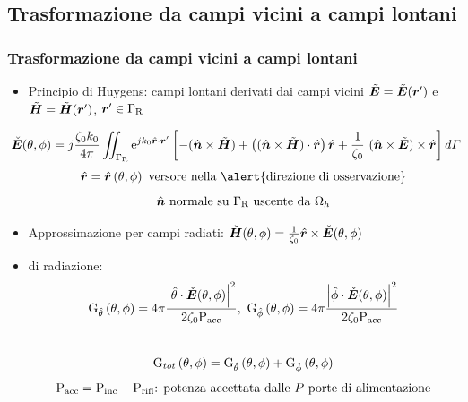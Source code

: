 \documentclass[11pt]{beamer}
\begin{document}
\subsection{Trasformazione da campi vicini a campi lontani}
\frame
{
\frametitle{Trasformazione da campi vicini a campi lontani}
\begin{itemize}
\item \alert{Principio di Huygens}: campi lontani derivati dai campi vicini $\tilde{\mbfit{E}}=\tilde{\mbfit{E}}(\mbfit{r'})$ e $\tilde{\mbfit{H}}=\tilde{\mbfit{H}}(\mbfit{r'})$, $\mbfit{r'} \in \mrm{\Gamma_R}$
\begin{center}
\vspace{-.5cm} \scriptsize $$\hspace{-.5cm}\check{\mbfit{E}}(\theta, \phi) = j \frac{\zeta_0 k_0}{4 \pi} \int \! \! \! \! \int_\mrm{\Gamma_R}  \mrm{e}^{jk_0 \hat{\mbfit{r}} \cdot \mbfit{r'}} \left [ - (\hat{\mbfit{n}} \times \tilde{\mbfit{H}})  + \left ( ( \hat{\mbfit{n}} \times \tilde{\mbfit{H}} ) \cdot \hat{\mbfit{r}} \right ) \hat{\mbfit{r}} + \frac{1}{\zeta_0} \ (\hat{\mbfit{n}} \times \tilde{\mbfit{E}})  \times \hat{\mbfit{r}} \right ]  d{\Gamma}$$ \vspace{-.2cm} \footnotesize $$ \hat{\mbfit{r}} = \hat{\mbfit{r}} \left ( \theta, \phi \right ) \textnormal{ versore nella \alert{direzione di osservazione}}$$ \vspace{-.5cm} $$\hat{\mbfit{n}} \textnormal{ normale su } \mrm{\Gamma_R} \textnormal{ uscente da } \mrm{\Omega}_h $$
\end{center} %
\pause
\item \normalsize \alert{Approssimazione per campi radiati}: $\check{\mbfit{H}}(\theta, \phi) =  \frac{1}{\zeta_0} \hat{\mbfit{r}} \times \check{\mbfit{E}}(\theta, \phi )$ \\ \pause %
\item \alert{ di radiazione}: \vspace{-.2cm}
$$\mrm{G}_{\hat{\theta}} \left ( \theta, \phi \right ) = 4 \pi \frac{\left | {{\hat{\theta}}} \cdot \check{\mbfit E} (\theta, \phi) \right |^2}{ 2 \zeta_0 \mrm{P}_\mrm{acc}}, \ \mrm{G}_{\hat{\phi}} \left ( \theta, \phi \right ) = 4 \pi \frac{\left | {\hat{\phi}} \cdot \check{\mbfit E} (\theta , \phi ) \right |^2}{ 2 \zeta_0 \mrm{P}_\mrm{acc}}$$ \\[-.2cm]
$$\mathrm{G}_{tot} \left ( \theta, \phi \right )  = \mathrm{G}_{\hat{\theta}} \left ( \theta, \phi \right ) + \mathrm{G}_{\hat{\phi}} \left ( \theta, \phi \right ) $$
\vspace{-.2cm} \footnotesize $$\mathrm{P_{acc}} = \mathrm{P_{inc}} - \mathrm{P_{rifl}}  \textnormal{: potenza accettata dalle }P\textnormal{ porte di alimentazione}$$

\end{itemize}
}
\end{document}
